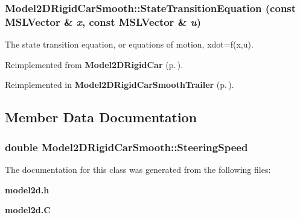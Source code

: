 \subsubsection{ Model2DRigid\-Car\-Smooth::State\-Transition\-Equation (const {\bf MSLVector} \& {\em x}, const {\bf MSLVector} \& {\em u})\hspace{0.3cm}{\tt  [virtual]}}\label{classModel2DRigidCarSmooth_a2}


The state transition equation, or equations of motion, xdot=f(x,u).



Reimplemented from {\bf Model2DRigid\-Car} {\rm (p.\,\pageref{classModel2DRigidCar_a2})}.

Reimplemented in {\bf Model2DRigid\-Car\-Smooth\-Trailer} {\rm (p.\,\pageref{classModel2DRigidCarSmoothTrailer_a2})}.

\subsection{Member Data Documentation}
\subsubsection{\setlength{\rightskip}{0pt plus 5cm}double Model2DRigid\-Car\-Smooth::Steering\-Speed}\label{classModel2DRigidCarSmooth_m0}




The documentation for this class was generated from the following files:\begin{CompactItemize}
\item 
{\bf model2d.h}\item 
{\bf model2d.C}\end{CompactItemize}

